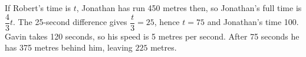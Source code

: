 If Robert's time is $ t $, Jonathan has run 450 metres then, so Jonathan's full time is $\dfrac{4}{3}t $. The 25-second difference gives $\dfrac{t}{3}=25 $, hence $ t=75 $ and Jonathan's time 100. Gavin takes 120 seconds, so his speed is 5 metres per second. After 75 seconds he has 375 metres behind him, leaving $\boxed{225}$ metres.
